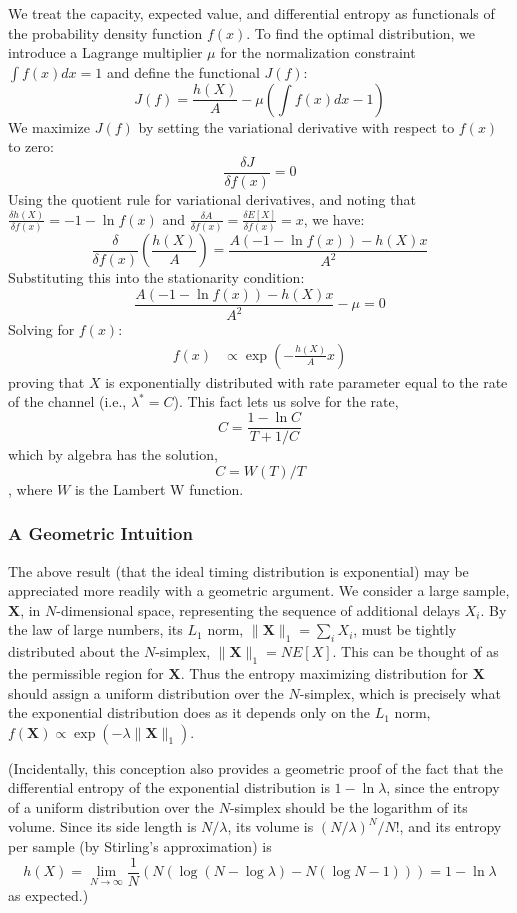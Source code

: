 We treat the capacity, expected value, and differential entropy as functionals of the probability density function $f(x)$.
To find the optimal distribution, we introduce a Lagrange multiplier $\mu$ for the normalization constraint $\int f(x) dx = 1$ and define the functional $J(f)$:
$$J(f) = \frac{h(X)}{A} - \mu \left( \int f(x)dx - 1 \right)$$
We maximize $J(f)$ by setting the variational derivative with respect to $f(x)$ to zero:
$$\frac{\delta J}{\delta f(x)} = 0$$
Using the quotient rule for variational derivatives, and noting that $\frac{\delta h(X)}{\delta f(x)} = -1 - \ln f(x)$ and $\frac{\delta A}{\delta f(x)} = \frac{\delta E[X]}{\delta f(x)} = x$, we have:
\[
\frac{\delta}{\delta f(x)} \left( \frac{h(X)}{A} \right) = \frac{A(-1 - \ln f(x)) - h(X)x}{A^2}
\]
Substituting this into the stationarity condition:
\[
\frac{A(-1 - \ln f(x)) - h(X)x}{A^2} - \mu = 0
\]
Solving for $f(x)$:
\begin{align*}
f(x) &\propto \exp\left( - \frac{h(X)}{A} x \right)
\end{align*}
proving that $X$ is exponentially distributed with rate parameter equal to the rate of the channel
(i.e., $\lambda^* = C$).
This fact lets us solve for the rate,
$$C = \frac{1 - \ln C}{T + 1/C}$$
which by algebra has the solution,
$$C = W(T) / T$$, where $W$ is the Lambert W function.
\subsubsection{A Geometric Intuition}
The above result (that the ideal timing distribution is exponential) may
be appreciated more readily with a geometric argument.
We consider a large sample, $\mathbf{X}$, in $N$-dimensional space,
representing the sequence of additional delays $X_i$.
By the law of large numbers, its $L_1$ norm, $\|\mathbf{X}\|_1 = \sum_i X_i$, must be
tightly distributed about the $N$-simplex, $\|\mathbf{X}\|_1 = NE[X]$.
This can be thought of as the permissible region for $\mathbf{X}$. Thus the entropy maximizing
distribution for $\mathbf{X}$ should assign a uniform distribution over the $N$-simplex,
which is precisely what the exponential distribution does as it
depends only on the $L_1$ norm, $f(\mathbf{X}) \propto \exp(-\lambda \|\mathbf{X}\|_1)$.

(Incidentally, this conception also provides a geometric proof of the fact that the
differential entropy of the exponential distribution is $1 - \ln \lambda $, since 
the entropy of a uniform distribution over the $N$-simplex should be the logarithm of
its volume. Since its side length is $N/\lambda$, its volume is $(N/\lambda)^N / N!$,
and its entropy per sample (by Stirling's approximation) is
$$h(X) = \lim_{N \to \infty} \frac{1}{N} \left( N (\log(N - \log \lambda) - N (\log N - 1)) \right) = 1 - \ln \lambda$$
as expected.)




